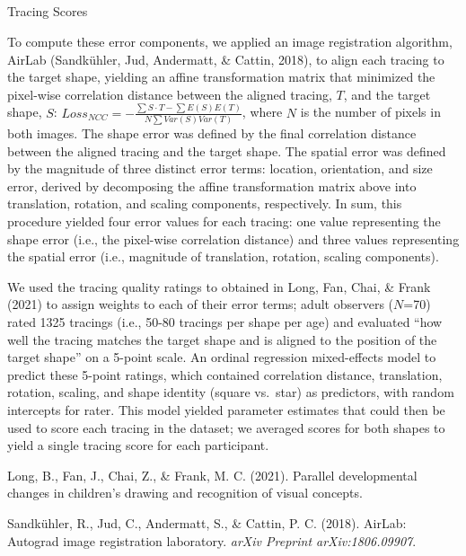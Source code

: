 \clearpage
\makeatletter
\efloat@restorefloats
\makeatother


\begin{appendix}
\section{}
Tracing Scores

To compute these error components, we applied an image registration
algorithm, AirLab (Sandkühler, Jud, Andermatt, \& Cattin, 2018), to
align each tracing to the target shape, yielding an affine
transformation matrix that minimized the pixel-wise correlation distance
between the aligned tracing, \(T\), and the target shape, \(S\):
\(Loss_{NCC} = - \frac{\sum S \cdot T - \sum E(S) E(T)}{N \sum Var(S) Var(T)}\),
where \(N\) is the number of pixels in both images. The shape error was
defined by the final correlation distance between the aligned tracing
and the target shape. The spatial error was defined by the magnitude of
three distinct error terms: location, orientation, and size error,
derived by decomposing the affine transformation matrix above into
translation, rotation, and scaling components, respectively. In sum,
this procedure yielded four error values for each tracing: one value
representing the shape error (i.e., the pixel-wise correlation distance)
and three values representing the spatial error (i.e., magnitude of
translation, rotation, scaling components).

We used the tracing quality ratings to obtained in Long, Fan, Chai, \&
Frank (2021) to assign weights to each of their error terms; adult
observers (\(N\)=70) rated 1325 tracings (i.e., 50-80 tracings per shape
per age) and evaluated ``how well the tracing matches the target shape
and is aligned to the position of the target shape'' on a 5-point scale.
An ordinal regression mixed-effects model to predict these 5-point
ratings, which contained correlation distance, translation, rotation,
scaling, and shape identity (square vs.~star) as predictors, with random
intercepts for rater. This model yielded parameter estimates that could
then be used to score each tracing in the dataset; we averaged scores
for both shapes to yield a single tracing score for each participant.

\hypertarget{refs}{}
\leavevmode\hypertarget{ref-long2021parallel}{}%
Long, B., Fan, J., Chai, Z., \& Frank, M. C. (2021). Parallel
developmental changes in children's drawing and recognition of visual
concepts.

\leavevmode\hypertarget{ref-sandkuhler2018}{}%
Sandkühler, R., Jud, C., Andermatt, S., \& Cattin, P. C. (2018). AirLab:
Autograd image registration laboratory. \emph{arXiv Preprint
arXiv:1806.09907}.
\end{appendix}
